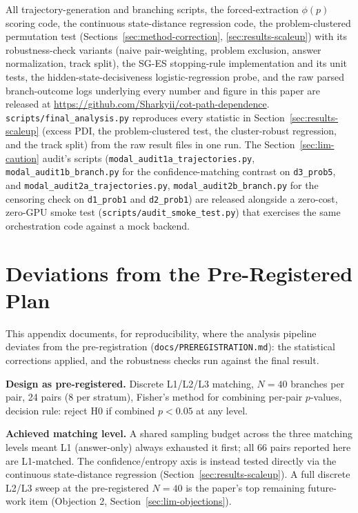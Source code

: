 \documentclass{article}
\begin{document}
All trajectory-generation and branching scripts, the forced-extraction $\phi(p)$ scoring code, the continuous state-distance regression code, the problem-clustered permutation test (Sections~\ref{sec:method-correction}, \ref{sec:results-scaleup}) with its robustness-check variants (naive pair-weighting, problem exclusion, answer normalization, track split), the SG-ES stopping-rule implementation and its unit tests, the hidden-state-decisiveness logistic-regression probe, and the raw parsed branch-outcome logs underlying every number and figure in this paper are released at \url{https://github.com/Sharkyii/cot-path-dependence}. \texttt{scripts/final\_analysis.py} reproduces every statistic in Section~\ref{sec:results-scaleup} (excess PDI, the problem-clustered test, the cluster-robust regression, and the track split) from the raw result files in one run. The Section~\ref{sec:lim-caution} audit's scripts (\texttt{modal\_audit1a\_trajectories.py}, \texttt{modal\_audit1b\_branch.py} for the confidence-matching contrast on \texttt{d3\_prob5}, and \texttt{modal\_audit2a\_trajectories.py}, \texttt{modal\_audit2b\_branch.py} for the censoring check on \texttt{d1\_prob1} and \texttt{d2\_prob1}) are released alongside a zero-cost, zero-GPU smoke test (\texttt{scripts/audit\_smoke\_test.py}) that exercises the same orchestration code against a mock backend.

\appendix

\section{Deviations from the Pre-Registered Plan}
\label{sec:appendixa}

This appendix documents, for reproducibility, where the analysis pipeline deviates from the pre-registration (\texttt{docs/PREREGISTRATION.md}): the statistical corrections applied, and the robustness checks run against the final result.

\textbf{Design as pre-registered.} Discrete L1/L2/L3 matching, $N=40$ branches per pair, 24 pairs (8 per stratum), Fisher's method for combining per-pair $p$-values, decision rule: reject H0 if combined $p < 0.05$ at any level.

\textbf{Achieved matching level.} A shared sampling budget across the three matching levels meant L1 (answer-only) always exhausted it first; all 66 pairs reported here are L1-matched. The confidence/entropy axis is instead tested directly via the continuous state-distance regression (Section~\ref{sec:results-scaleup}). A full discrete L2/L3 sweep at the pre-registered $N=40$ is the paper's top remaining future-work item (Objection 2, Section~\ref{sec:lim-objections}).
\end{document}
